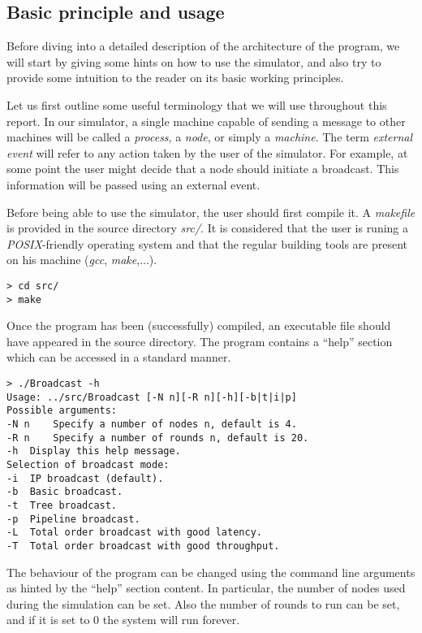 \documentclass[a4paper]{article}
\begin{document}
\subsection{Basic principle and usage}
Before diving into a detailed description of the architecture of the program,
we will start by giving some hints on how to use the simulator, and also try
to provide some intuition to the reader on its basic working principles.

Let us first outline some useful terminology that we will use throughout this
report. In our simulator, a single machine capable of sending a message to
other machines will be called a \textit{process}, a \textit{node}, or simply
a \textit{machine}. The term \textit{external event} will refer to any action
taken by the user of the simulator. For example, at some point the user might
decide that a node should initiate a broadcast. This information will be
passed using an external event.

Before being able to use the simulator, the user should first compile it. A
\textit{makefile} is provided in the source directory \textit{src/}. It is
considered that the user is runing a \textit{POSIX}-friendly operating system
and that the regular building tools are present on his machine (\textit{gcc},
\textit{make},...).
\begin{lstlisting}
> cd src/
> make
\end{lstlisting}

Once the program has been (successfully) compiled, an executable file should
have appeared in the source directory. The program contains a ``help'' section
which can be accessed in a standard manner.
\begin{lstlisting}
> ./Broadcast -h
Usage: ../src/Broadcast [-N n][-R n][-h][-b|t|i|p]
Possible arguments:
-N n	Specify a number of nodes n, default is 4.
-R n	Specify a number of rounds n, default is 20.
-h	Display this help message.
Selection of broadcast mode:
-i	IP broadcast (default).
-b	Basic broadcast.
-t	Tree broadcast.
-p	Pipeline broadcast.
-L	Total order broadcast with good latency.
-T	Total order broadcast with good throughput.
\end{lstlisting}

The behaviour of the program can be changed using the command line arguments
as hinted by the ``help'' section content. In particular, the number of nodes
used during the simulation can be set. Also the number of rounds to run can be
set, and if it is set to $0$ the system will run forever.
\end{document}
